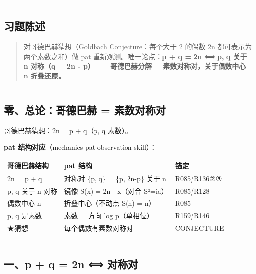 \documentclass[
]{article}
\newcounter{none} %
\begin{document}
\begin{center}\rule{0.5\linewidth}{0.5pt}\end{center}

\subsection{习题陈述}\label{ux4e60ux9898ux9648ux8ff0}

\begin{quote}
对哥德巴赫猜想（Goldbach Conjecture：每个大于 2 的偶数 2n
都可表示为两个素数之和）做 pat 重新观测。唯一论点：\textbf{p + q = 2n ⟺
p, q 关于 n 对称（q = 2n - p）------哥德巴赫分解 =
素数对称对，关于偶数中心 n 折叠还原。}
\end{quote}

\begin{center}\rule{0.5\linewidth}{0.5pt}\end{center}

\subsection{零、总论：哥德巴赫 =
素数对称对}\label{ux96f6ux603bux8bbaux54e5ux5fb7ux5df4ux8d6b-ux7d20ux6570ux5bf9ux79f0ux5bf9}

哥德巴赫猜想：2n = p + q（p, q 素数）。

\textbf{pat 结构对应}（mechanics-pat-observation skill）：

{\def\LTcaptype{none} %
\begin{longtable}[]{@{}lll@{}}
\toprule\noalign{}
哥德巴赫结构 & pat 结构 & 锚定 \\
\midrule\noalign{}
\endhead
\bottomrule\noalign{}
\endlastfoot
2n = p + q & 对称对 \{p, q\} = \{p, 2n-p\} 关于 n & R085/R136②③ \\
p, q 关于 n 对称 & 镜像 S(x) = 2n - x（对合 S²=id） & R085/R128 \\
偶数中心 n & 折叠中心（不动点 S(n) = n） & R085 \\
p, q 是素数 & 素数 = 方向 log p（单相位） & R159/R146 \\
★猜想 & 每个偶数有素数对称对 & CONJECTURE \\
\end{longtable}
}

\begin{center}\rule{0.5\linewidth}{0.5pt}\end{center}

\subsection{一、p + q = 2n ⟺
对称对}\label{ux4e00p-q-2n-ux5bf9ux79f0ux5bf9}
\end{document}
